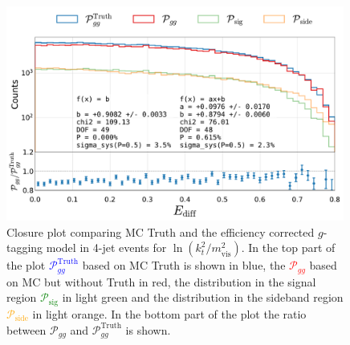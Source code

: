 \begin{figure}
  \centerfloat
  \includegraphics[width=0.99\textwidth, trim=10 0 20 5, clip, page=7]{figures/quarks/gtag-closure_test-down_sample=1.00-ML_vars=vertex-selection=b-ejet_min=4-n_iter_RS_lgb=99-n_iter_RS_xgb=9-cdot_cut=0.90-version=19-njet=4.pdf}
  \caption[Closure Plot Comparing MC Truth and the Efficiency Corrected $g$-Tagging Model in 4-Jet Events for $\ln \left( k_t^2 / m_\mathrm{vis}^2 \right)$]
          {Closure plot comparing MC Truth and the efficiency corrected $g$-tagging model in 4-jet events for $\ln \left( k_t^2 / m_\mathrm{vis}^2 \right)$. In the top part of the plot \textcolor{blue}{$\mathcal{P}_{gg}^\mathrm{Truth}$} based on MC Truth is shown in blue, the \textcolor{red}{$\mathcal{P}_{gg}$} based on MC but without Truth in red, the distribution in the signal region \textcolor{green}{$\mathcal{P}_{\mathrm{sig}}$} in light green and the distribution in the sideband region \textcolor{orange}{$\mathcal{P}_{\mathrm{side}}$} in light orange. In the bottom part of the plot the ratio between $\mathcal{P}_{gg}$ and $\mathcal{P}_{gg}^\mathrm{Truth}$  is shown. } 
  \label{fig:q:closure_ln_kt_m_vis}
\end{figure}
